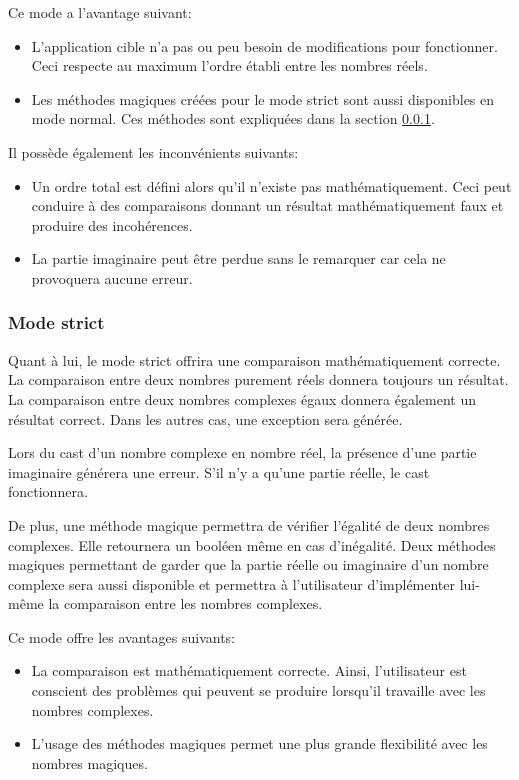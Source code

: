 Ce mode a l'avantage suivant:
\begin{itemize}
    \item L'application cible n'a pas ou peu besoin de modifications pour fonctionner. Ceci respecte au maximum l'ordre établi entre les nombres réels.
    \item Les méthodes magiques créées pour le mode strict sont aussi disponibles en mode normal. Ces méthodes sont expliquées dans la section \ref{sec:complex_design_modes_strict}.
\end{itemize}

Il possède également les inconvénients suivants:
\begin{itemize}
    \item Un ordre total est défini alors qu'il n'existe pas mathématiquement. Ceci peut conduire à des comparaisons donnant un résultat mathématiquement faux et produire des incohérences.
    \item La partie imaginaire peut être perdue sans le remarquer car cela ne provoquera aucune erreur.
\end{itemize}

\subsubsection{Mode strict}
\label{sec:complex_design_modes_strict}

Quant à lui, le mode strict offrira une comparaison mathématiquement correcte. La comparaison entre deux nombres purement réels donnera toujours un résultat. La comparaison entre deux nombres complexes égaux donnera également un résultat correct. Dans les autres cas, une exception sera générée.

Lors du cast d'un nombre complexe en nombre réel, la présence d'une partie imaginaire générera une erreur. S'il n'y a qu'une partie réelle, le cast fonctionnera.

De plus, une méthode magique permettra de vérifier l'égalité de deux nombres complexes. Elle retournera un booléen même en cas d'inégalité. Deux méthodes magiques permettant de garder que la partie réelle ou imaginaire d'un nombre complexe sera aussi disponible et permettra à l'utilisateur d'implémenter lui-même la comparaison entre les nombres complexes.

Ce mode offre les avantages suivants:
\begin{itemize}
    \item La comparaison est mathématiquement correcte. Ainsi, l'utilisateur est conscient des problèmes qui peuvent se produire lorsqu'il travaille avec les nombres complexes.
    \item L'usage des méthodes magiques permet une plus grande flexibilité avec les nombres magiques.
\end{itemize}

